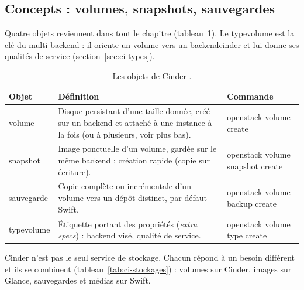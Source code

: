 \subsection{Concepts : volumes, snapshots, sauvegardes}\label{sec:ci-concepts}

Quatre objets reviennent dans tout le chapitre (tableau~\ref{tab:ci-objets}). Le \gls{typevolume} est la clé
du multi-backend : il oriente un volume vers un \gls{backendcinder} et lui donne ses qualités de service
(section~\ref{sec:ci-types}).

\begin{table}[!ht]
\centering
\renewcommand{\arraystretch}{1.3}
\begin{tabular}{@{}>{\raggedright\arraybackslash}p{3.0cm}>{\raggedright\arraybackslash}p{8.0cm}>{\raggedright\arraybackslash\ttfamily}p{4.5cm}@{}}
\toprule
\textbf{Objet} & \textbf{Définition} & \textrm{\textbf{Commande}} \\
\midrule
\Gls{volume} & Disque persistant d'une taille donnée, créé sur un backend et attaché à une instance à la fois (ou à plusieurs, voir plus bas). & openstack volume create \\
\Gls{snapshot} & Image ponctuelle d'un volume, gardée sur le même backend ; création rapide (copie sur écriture). & openstack volume snapshot create \\
\Gls{sauvegarde} & Copie complète ou incrémentale d'un volume vers un dépôt distinct, par défaut Swift. & openstack volume backup create \\
\Gls{typevolume} & Étiquette portant des propriétés (\emph{extra specs}) : backend visé, qualité de service. & openstack volume type create \\
\bottomrule
\end{tabular}
\caption{Les objets de Cinder \parencite{cinder-backups}.}
\label{tab:ci-objets}
\end{table}

Cinder n'est pas le seul service de stockage. Chacun répond à un besoin différent et ils se combinent
(tableau~\ref{tab:ci-stockages}) : volumes sur Cinder, images sur Glance, sauvegardes et médias sur Swift.

